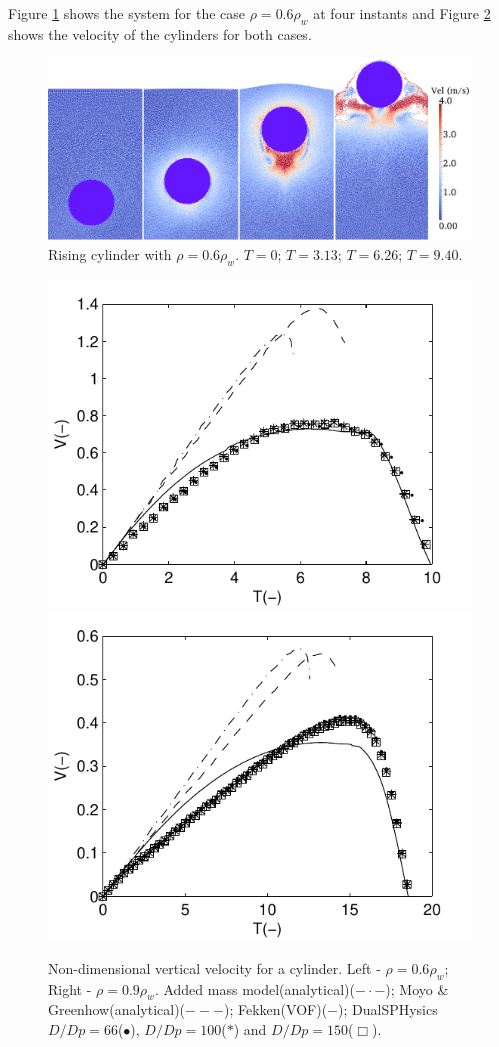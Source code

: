 Figure \ref{fig:311_1_snaps} shows the system for the case $\rho=0.6\rho_{w}$ at four instants and Figure \ref{fig:311_1} shows the velocity of the cylinders for both cases.
%
\begin{figure}[ht!]
	\centering
	\includegraphics[width=0.9\linewidth]{Figures/5.Chapter/fig5_II} 	
	\caption{{ Rising cylinder with $\rho=0.6\rho_{w}$. $T=0$; $T=3.13$; $T=6.26$; $T=9.40$.}}
	\label{fig:311_1_snaps} 
\end{figure}
%

%
\begin{figure}[ht!]
	\centering
	\includegraphics[width=0.49\linewidth]{Figures/5.Chapter/fig10} 
	\includegraphics[width=0.49\linewidth]{Figures/5.Chapter/fig11}
	\caption{{Non-dimensional vertical velocity for a cylinder. Left - $\rho=0.6\rho_{w}$; Right - $\rho=0.9\rho_{w}$. Added mass model(analytical)\cite{Fekken-2004}($-\cdot-$); Moyo \& Greenhow(analytical)\cite{Moyo-2000}($---$); Fekken(\ac{VOF})\cite{Fekken-2004}($-$); DualSPHysics $D/Dp=66$($\bullet$), $D/Dp=100$($\ast$) and $D/Dp=150$($\Box$).}}
	\label{fig:311_1} 
\end{figure}
%

